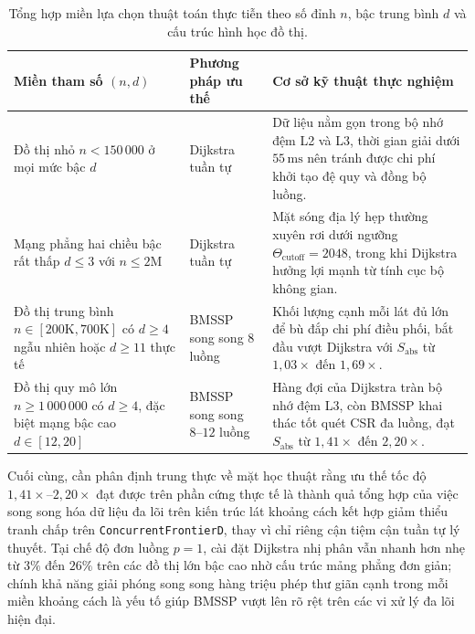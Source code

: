 \begin{table}[!htb]
\centering
{\small\setlength{\tabcolsep}{5pt}\setlength{\baselineskip}{13.5pt}
\begin{tabularx}{\textwidth}{@{} >{\raggedright\arraybackslash}p{3.65cm} >{\raggedright\arraybackslash}p{2.75cm} >{\raggedright\arraybackslash}X @{}}
\toprule
\textbf{Miền tham số $(n, d)$} & \textbf{Phương pháp ưu thế} & \textbf{Cơ sở kỹ thuật thực nghiệm} \\
\midrule
Đồ thị nhỏ $n < 150\,000$ ở mọi mức bậc $d$ & Dijkstra tuần tự & Dữ liệu nằm gọn trong bộ nhớ đệm L2 và L3, thời gian giải dưới $55\,\mathrm{ms}$ nên tránh được chi phí khởi tạo đệ quy và đồng bộ luồng. \\
\addlinespace[5pt]
Mạng phẳng hai chiều bậc rất thấp $d \le 3$ với $n \le 2\mathrm{M}$ & Dijkstra tuần tự & Mặt sóng địa lý hẹp thường xuyên rơi dưới ngưỡng $\Theta_{\mathrm{cutoff}} = 2048$, trong khi Dijkstra hưởng lợi mạnh từ tính cục bộ không gian. \\
\addlinespace[5pt]
Đồ thị trung bình $n \in [200\mathrm{K}, 700\mathrm{K}]$ có $d \ge 4$ ngẫu nhiên hoặc $d \ge 11$ thực tế & BMSSP song song $8$ luồng & Khối lượng cạnh mỗi lát đủ lớn để bù đắp chi phí điều phối, bắt đầu vượt Dijkstra với $S_{\mathrm{abs}}$ từ $1{,}03\times$ đến $1{,}69\times$. \\
\addlinespace[5pt]
Đồ thị quy mô lớn $n \ge 1\,000\,000$ có $d \ge 4$, đặc biệt mạng bậc cao $d \in [12, 20]$ & BMSSP song song $8\text{--}12$ luồng & Hàng đợi của Dijkstra tràn bộ nhớ đệm L3, còn BMSSP khai thác tốt quét CSR đa luồng, đạt $S_{\mathrm{abs}}$ từ $1{,}41\times$ đến $2{,}20\times$. \\
\bottomrule
\end{tabularx}
}
\caption{Tổng hợp miền lựa chọn thuật toán thực tiễn theo số đỉnh $n$, bậc trung bình $d$ và cấu trúc hình học đồ thị.}
\label{tab:selection_guide}
\end{table}

Cuối cùng, cần phân định trung thực về mặt học thuật rằng ưu thế tốc độ $1{,}41\times$--$2{,}20\times$ đạt được trên phần cứng thực tế là thành quả tổng hợp của việc song song hóa dữ liệu đa lõi trên kiến trúc lát khoảng cách kết hợp giảm thiểu tranh chấp trên \texttt{Concurrent\allowbreak FrontierD}, thay vì chỉ riêng cận tiệm cận tuần tự lý thuyết. Tại chế độ đơn luồng $p = 1$, cài đặt Dijkstra nhị phân vẫn nhanh hơn nhẹ từ $3\%$ đến $26\%$ trên các đồ thị lớn bậc cao nhờ cấu trúc mảng phẳng đơn giản; chính khả năng giải phóng song song hàng triệu phép thư giãn cạnh trong mỗi miền khoảng cách là yếu tố giúp BMSSP vượt lên rõ rệt trên các vi xử lý đa lõi hiện đại.

